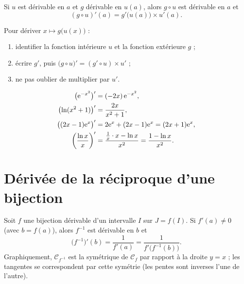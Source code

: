 \begin{theoreme}
	Si $u$ est dérivable en $a$ et $g$ dérivable en $u(a)$, alors $g\circ u$ est
	dérivable en $a$ et
	\[
	(g\circ u)'(a)=g'\bigl(u(a)\bigr)\times u'(a).
	\]
\end{theoreme}

\begin{methode}
	Pour dériver $x\mapsto g\bigl(u(x)\bigr)$ :
	\begin{enumerate}
		\item identifier la fonction intérieure $u$ et la fonction extérieure $g$ ;
		\item écrire $g'$, puis $\bigl(g\circ u\bigr)'=(g'\circ u)\times u'$ ;
		\item ne pas oublier de multiplier par $u'$.
	\end{enumerate}
\end{methode}

\begin{exemple}
	\[
	\begin{aligned}
		\bigl(\mathrm{e}^{-x^{2}}\bigr)' &= (-2x)\,\mathrm{e}^{-x^{2}}, \\
		\bigl(\ln(x^{2}+1)\bigr)' &= \frac{2x}{x^{2}+1}, \\
		\bigl((2x-1)\mathrm{e}^{x}\bigr)' &= 2\mathrm{e}^{x}+(2x-1)\mathrm{e}^{x}=(2x+1)\mathrm{e}^{x}, \\
		\left(\frac{\ln x}{x}\right)' &= \frac{\frac1x\cdot x-\ln x}{x^{2}}
		=\frac{1-\ln x}{x^{2}}.
	\end{aligned}
	\]
\end{exemple}


\section{Dérivée de la réciproque d'une bijection}

\begin{theoreme}
	Soit $f$ une bijection dérivable d'un intervalle $I$ sur $J=f(I)$. Si
	$f'(a)\neq 0$ (avec $b=f(a)$), alors $f^{-1}$ est dérivable en $b$ et
	\[
	\bigl(f^{-1}\bigr)'(b)=\frac{1}{f'(a)}=\frac{1}{f'\!\bigl(f^{-1}(b)\bigr)}.
	\]
	Graphiquement, $\mathcal C_{f^{-1}}$ est la symétrique de $\mathcal C_f$ par
	rapport à la droite $y=x$ ; les tangentes se correspondent par cette
	symétrie (les pentes sont inverses l'une de l'autre).
\end{theoreme}

